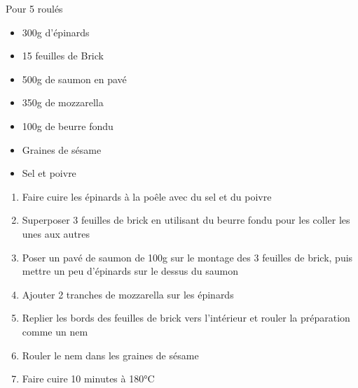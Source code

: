 \bigskip
{}
{Pour 5 roulés}{
 \begin{itemize}
  \item 300g d'épinards
  \item 15 feuilles de Brick
  \item 500g de saumon en pavé
  \item 350g de mozzarella
  \item 100g de beurre fondu
  \item Graines de sésame
  \item Sel et poivre
\end{itemize}}
{\begin{enumerate}
	\item Faire cuire les épinards à la poêle avec du sel et du poivre
	\item Superposer 3 feuilles de brick en utilisant du beurre fondu pour les coller les unes aux autres
	\item Poser un pavé de saumon de 100g sur le montage des 3 feuilles de brick, puis mettre un peu d'épinards sur le dessus du saumon
	\item Ajouter 2 tranches de mozzarella sur les épinards
	\item Replier les bords des feuilles de brick vers l'intérieur et rouler la préparation comme un nem
	\item Rouler le nem dans les graines de sésame
	\item Faire cuire 10 minutes à 180°C
\end{enumerate}
}

